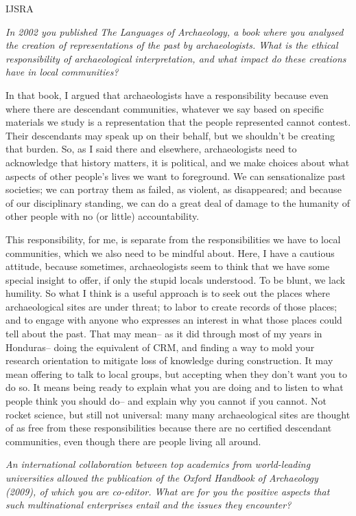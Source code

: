 \begin{labeling}{IJSRA}
\item[IJSRA] \textit{In 2002 you published \emph{The Languages of Archaeology}, a book where you analysed the creation of representations of the past by archaeologists. What is the ethical responsibility of archaeological interpretation, and what impact do these creations have in local communities?} 

\item[RAJ] In that book, I argued that archaeologists have a responsibility because even where there are descendant communities, whatever we say based on specific materials we study is a representation that the people represented cannot contest. Their descendants may speak up on their behalf, but we shouldn't be creating that burden. So, as I said there and elsewhere, archaeologists need to acknowledge that history matters, it is political, and we make choices about what aspects of other people's lives we want to foreground. We can sensationalize past societies; we can portray them as failed, as violent, as disappeared; and because of our disciplinary standing, we can do a great deal of damage to the humanity of other people with no (or little) accountability.

This responsibility, for me, is separate from the responsibilities we have to local communities, which we also need to be mindful about. Here, I have a cautious attitude, because sometimes, archaeologists seem to think that we have some special insight to offer, if only the stupid locals understood. To be blunt, we lack humility. So what I think is a useful approach is to seek out the places where archaeological sites are under threat; to labor to create records of those places; and to engage with anyone who expresses an interest in what those places could tell about the past. That may mean-- as it did through most of my years in Honduras-- doing the equivalent of CRM, and finding a way to mold your research orientation to mitigate loss of knowledge during construction. It may mean offering to talk to local groups, but accepting when they don't want you to do so. It means being ready to explain what you are doing and to listen to what people think you should do-- and explain why you cannot if you cannot. Not rocket science, but still not universal: many many archaeological sites are thought of as free from these responsibilities because there are no certified descendant communities, even though there are people living all around.

\item[IJSRA] \textit{An international collaboration between top academics from world-leading universities allowed the publication of the \emph{Oxford Handbook of Archaeology} (2009), of which you are co-editor. What are for you the positive aspects that such multinational enterprises entail and the issues they encounter?}


\end{labeling}
